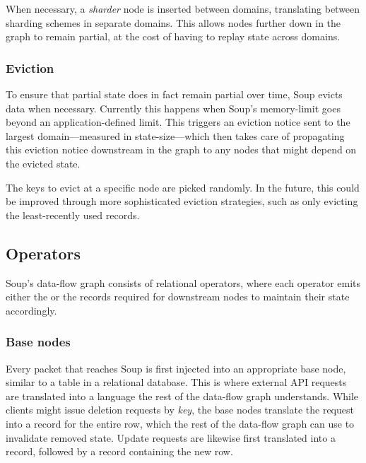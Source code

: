 When necessary, a \textit{sharder} node is inserted between domains, translating
between sharding schemes in separate domains. This allows nodes further down in
the graph to remain partial, at the cost of having to replay state across
domains.


\subsubsection{Eviction}\label{sec:eviction}

To ensure that partial state does in fact remain partial over time, Soup evicts
data when necessary. Currently this happens when Soup's memory-limit goes beyond
an application-defined limit. This triggers an eviction notice sent to the
largest domain---measured in state-size---which then takes care of propagating
this eviction notice downstream in the graph to any nodes that might depend on
the evicted state.


The keys to evict at a specific node are picked randomly. In the future, this
could be improved through more sophisticated eviction strategies, such as only
evicting the least-recently used records.

\subsection{Operators}

Soup's data-flow graph consists of relational operators, where each operator
emits either the  or the  records required for
downstream nodes to maintain their state accordingly.

\subsubsection{Base nodes}

Every packet that reaches Soup is first injected into an appropriate base node,
similar to a table in a relational database. This is where external API requests
are translated into a language the rest of the data-flow graph understands.
While clients might issue \eg deletion requests by \textit{key}, the base nodes
translate the request into a  record for the entire row, which
the rest of the data-flow graph can use to invalidate removed state. Update
requests are likewise first translated into a  record, followed
by a  record containing the new row.

